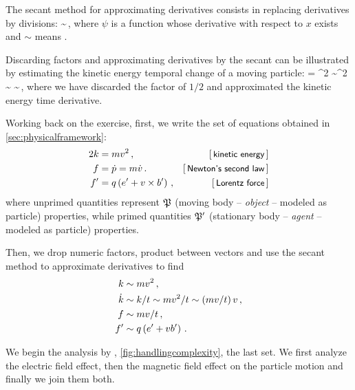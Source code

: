 The secant method for approximating derivatives consists in replacing derivatives by divisions:
%
\beq
   \sim {}\,,
\eeq
%
where $\psi$ is a function whose derivative with respect to $x$ exists and $\sim$ means .

Discarding factors and approximating derivatives by the secant can be illustrated by estimating the kinetic energy temporal change of a moving particle:
%
\beq
  \ekin = \mass\vel^2
        \sim\mass\vel^2
  \implies
  \dt\ekin \sim {} 
           \sim {}\,,
\eeq
%
where we have discarded the factor of $1/2$ and approximated the kinetic energy time derivative.

Working back on the exercise, first, we write the set of equations obtained in \cref{sec:physicalframework}:
%
\begin{align*}
  2\ekin  &= \mass\vel^2\,,                                   &\eqtxt{kinetic energy} \\
  \force  &= \dt\mom = \mass\dt\vel\,.                        &\eqtxt{Newton's second law} \\
  \force' &= \echarge\parth{\efield' + \vel\cprod\mfield'}\,, &\eqtxt{Lorentz force}
\end{align*}
%
where unprimed quantities represent $\mathfrak{P}$ (moving body -- \emph{object} -- modeled as particle) properties, while primed quantities $\mathfrak{P}'$ (stationary body -- \emph{agent} -- modeled as particle) properties.

Then, we drop numeric factors, product between vectors and use the secant method to approximate derivatives to find
%
\begin{align*}
  k    &\sim mv^2\,, \\
  \dot{k} &\sim k/t \sim mv^2/t \sim \left({mv/t}\right)v\,, \\
  f   &\sim mv/t\,, \\
  f'  &\sim q\left({e' + vb'}\right)\,.
\end{align*}

We begin the analysis by , \vide \cref{fig:handlingcomplexity}, the last set. We first analyze the electric field effect, then the magnetic field effect on the particle motion and finally we join them both.

